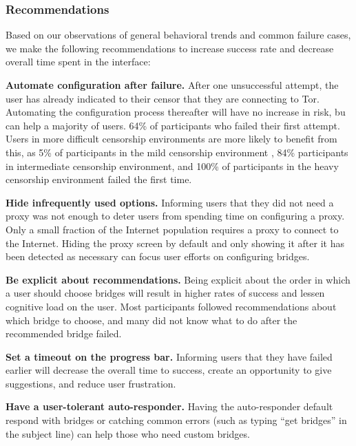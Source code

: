 \documentclass[USenglish,oneside,twocolumn]{article}
\begin{document}
\subsubsection{Recommendations}
\label{recommendations}
Based on our observations of general behavioral trends and common failure cases, we make the following recommendations to increase success rate and decrease overall time spent in the interface: \\

\begin{description}
\item {\bfseries Automate configuration after failure.} After one unsuccessful attempt, the user has already indicated to their censor that they are connecting to Tor. Automating the configuration process thereafter will have no increase in risk, bu can help a majority of users. 64\% of participants who failed their first attempt. Users in more difficult censorship environments are more likely to benefit from this, as 5\% of participants in the mild censorship environment , 84\% participants in intermediate censorship environment, and 100\% of participants in the heavy censorship environment failed the first time.
\item{\bfseries Hide infrequently used options.} Informing users that they did not need a proxy was not enough to deter users from spending time on configuring a proxy. Only a small fraction of the Internet population requires a proxy to connect to the Internet. Hiding the proxy screen by default and only showing it after it has been detected as necessary can focus user efforts on configuring bridges.
\item {\bfseries Be explicit about recommendations.} Being explicit about the order in which a user should choose bridges will result in higher rates of success and lessen cognitive load on the user. Most participants followed recommendations about which bridge to choose, and many did not know what to do after the recommended bridge failed. 
\item{\bfseries Set a timeout on the progress bar.} Informing users that they have failed earlier will decrease the overall time to success, create an opportunity to give suggestions, and reduce user frustration. 
\item{\bfseries Have a user-tolerant auto-responder.} Having the auto-responder default respond with bridges or catching common errors (such as typing ``get bridges'' in the subject line) can help those who need custom bridges. 
\end{description} 
\end{document}
